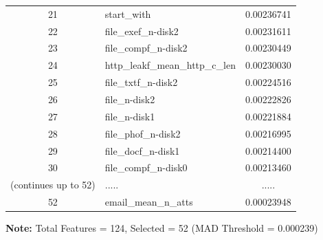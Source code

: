 \begin{table}[!ht]
\begin{tabular}{clc}
21 & start\_with & 0.00236741 \\ 22 & file\_exef\_n-disk2 & 0.00231611 \\ 23 & file\_compf\_n-disk2 & 0.00230449 \\ 24 & http\_leakf\_mean\_http\_c\_len & 0.00230030 \\ 25 & file\_txtf\_n-disk2 & 0.00224516 \\ 26 & file\_n-disk2 & 0.00222826 \\ 27 & file\_n-disk1 & 0.00221884 \\ 28 & file\_phof\_n-disk2 & 0.00216995 \\ 29 & file\_docf\_n-disk1 & 0.00214400 \\ 30 & file\_compf\_n-disk0 & 0.00213460 \\ (continues up to 52) &.....&.....\\ 52 & email\_mean\_n\_atts & 0.00023948 \\ \bottomrule
\end{tabular}
\vspace{0.2cm}
\scriptsize {\textbf{Note:} Total Features = 124, Selected = 52 (MAD Threshold = 0.000239)}
\end{table}

